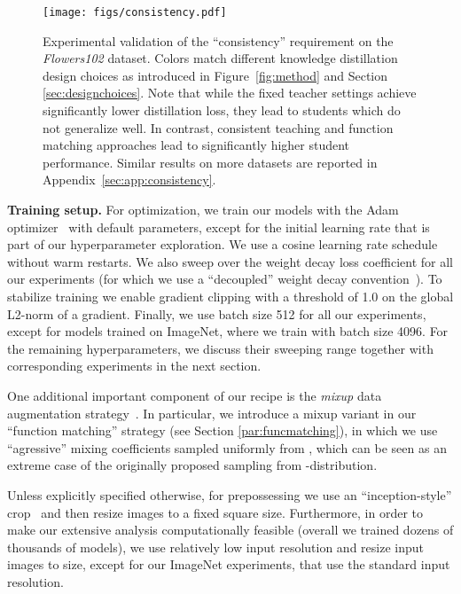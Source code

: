 \documentclass[10pt,twocolumn,letterpaper]{article}
\begin{document}
\begin{figure*}[t]\centering
    \texttt{[image: figs/consistency.pdf]}\caption{Experimental validation of the ``consistency'' requirement on the \emph{Flowers102} dataset. Colors match different knowledge distillation design choices as introduced in Figure~\ref{fig:method} and Section \ref{sec:designchoices}. Note that while the \textcolor{fixedcolor}{fixed teacher} settings achieve significantly lower distillation loss, they lead to students which do not generalize  well. In contrast, \textcolor{consicolor}{consistent teaching} and \textcolor{fnmatcolor}{function matching} approaches lead to significantly higher student performance. Similar results on more datasets are reported in Appendix~\ref{sec:app:consistency}.}\label{fig:consistency}\end{figure*}

\textbf{Training setup.} For optimization, we train our models with the Adam optimizer~\cite{adam} with default parameters, except for the initial learning rate that is part of our hyperparameter exploration. 
We use a cosine learning rate schedule~\cite{loshchilov2016sgdr} without warm restarts. 
We also sweep over the weight decay loss coefficient for all our experiments (for which we use a ``decoupled'' weight decay convention~\cite{loshchilov2017decoupled}).
To stabilize training we enable gradient clipping with a threshold of 1.0 on the global L2-norm of a gradient. Finally, we use batch size 512 for all our experiments, except for models trained on ImageNet, where we train with  batch size 4096.
For the remaining hyperparameters, we discuss their sweeping range together with corresponding experiments in the next section.

One additional important component of our recipe is the  \emph{mixup} data augmentation strategy~\cite{zhang2018mixup}.
In particular, we introduce a mixup variant in our ``function matching'' strategy (see Section \ref{par:funcmatching}), in which we 
use ``agressive'' mixing coefficients sampled uniformly from , which can be seen as an extreme case of 
the originally proposed sampling from -distribution.
  
Unless explicitly specified otherwise, for prepossessing we use an ``inception-style'' crop~\cite{szegedy2015going} and then resize images to a fixed square size. 
Furthermore, in order to make our extensive analysis computationally feasible (overall we trained dozens of thousands of models), we use relatively low input resolution and resize input images to  size, except for our ImageNet experiments, that use the standard input  resolution.
\end{document}
